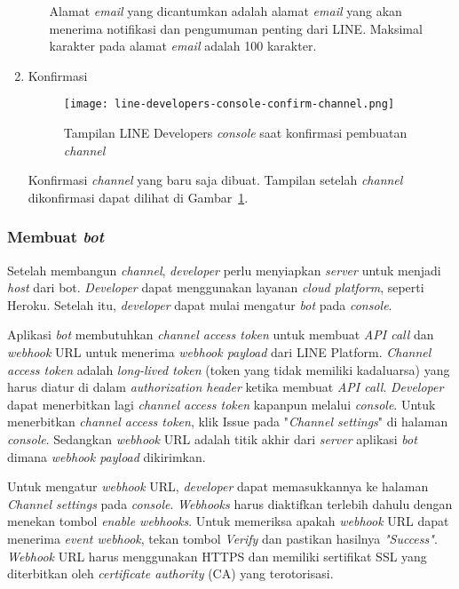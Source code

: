 \begin{enumerate}
\begin{itemize}
Alamat \textit{email} yang dicantumkan adalah alamat \textit{email} yang akan menerima notifikasi dan pengumuman penting dari LINE. Maksimal karakter pada alamat \textit{email} adalah 100 karakter.

\end{itemize}

\item Konfirmasi
\begin{figure}[H]
	\centering  
	\texttt{[image: line-developers-console-confirm-channel.png]}  
	\caption[Tampilan LINE Developers \textit{console} saat konfirmasi pembuatan \textit{channel}]{Tampilan LINE Developers \textit{console} saat konfirmasi pembuatan \textit{channel}} 
	\label{fig:line-developers-console-confirm-channel} 
\end{figure}

Konfirmasi \textit{channel} yang baru saja dibuat. Tampilan setelah \textit{channel} dikonfirmasi dapat dilihat di Gambar~\ref{fig:line-developers-console-confirm-channel}.

\end{enumerate}


\subsubsection{Membuat \textit{bot}}
Setelah membangun \textit{channel}, \textit{developer} perlu menyiapkan \textit{server} untuk menjadi \textit{host} dari bot. \textit{Developer} dapat menggunakan layanan \textit{cloud platform}, seperti Heroku. Setelah itu, \textit{developer} dapat mulai mengatur \textit{bot} pada \textit{console}.

Aplikasi \textit{bot} membutuhkan \textit{channel access token} untuk membuat \textit{API call} dan \textit{webhook} URL untuk menerima \textit{webhook payload} dari LINE Platform. \textit{Channel access token} adalah \textit{long-lived token} (token yang tidak memiliki kadaluarsa) yang harus diatur di dalam \textit{authorization header} ketika membuat \textit{API call}. \textit{Developer} dapat menerbitkan lagi \textit{channel access token} kapanpun melalui \textit{console}. Untuk menerbitkan \textit{channel access token}, klik Issue pada "\textit{Channel settings}" di halaman \textit{console}. Sedangkan\textit{ webhook} URL adalah titik akhir dari \textit{server} aplikasi \textit{bot} dimana \textit{webhook payload} dikirimkan.

Untuk mengatur \textit{webhook} URL, \textit{developer} dapat memasukkannya ke halaman \textit{Channel settings} pada \textit{console}. \textit{Webhooks} harus diaktifkan terlebih dahulu dengan menekan tombol \textit{enable webhooks}. Untuk memeriksa apakah \textit{webhook} URL dapat menerima \textit{event webhook}, tekan tombol \textit{Verify} dan pastikan hasilnya \textit{"Success"}. \textit{Webhook} URL harus menggunakan HTTPS dan memiliki sertifikat SSL yang diterbitkan oleh \textit{certificate authority} (CA) yang terotorisasi.

